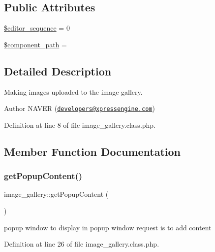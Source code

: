 \subsection*{Public Attributes}
\begin{DoxyCompactItemize}
\item 
\hyperlink{classimage__gallery_a63124b017697df694664efada4edd0be}{\$editor\+\_\+sequence} = 0
\item 
\hyperlink{classimage__gallery_a1ace79c095079e133d5f98625d89460e}{\$component\+\_\+path} = \textquotesingle{}\textquotesingle{}
\end{DoxyCompactItemize}


\subsection{Detailed Description}
Making images uploaded to the image gallery. 

\begin{DoxyAuthor}{Author}
N\+A\+V\+ER (\href{mailto:developers@xpressengine.com}{\tt developers@xpressengine.\+com}) 
\end{DoxyAuthor}


Definition at line 8 of file image\+\_\+gallery.\+class.\+php.



\subsection{Member Function Documentation}
\mbox{\label{classimage__gallery_a71ee76734048f188f3ec9caf692609b0}} 
\subsubsection{\texorpdfstring{get\+Popup\+Content()}{getPopupContent()}}
{\footnotesize\ttfamily image\+\_\+gallery\+::get\+Popup\+Content (\begin{DoxyParamCaption}{ }\end{DoxyParamCaption})}



popup window to display in popup window request is to add content 



Definition at line 26 of file image\+\_\+gallery.\+class.\+php.

